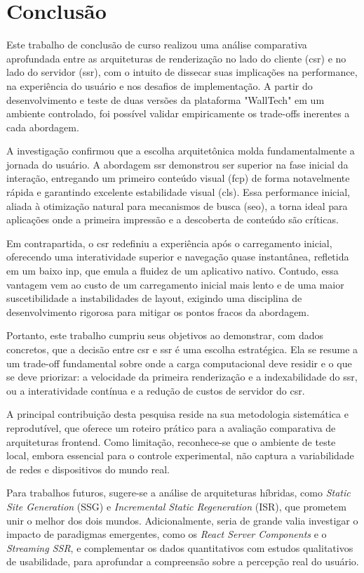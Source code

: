 \chapter{Conclusão}
\label{cap:conclusao}

Este trabalho de conclusão de curso realizou uma análise comparativa aprofundada entre as arquiteturas de renderização no lado do cliente (\acrshort{csr}) e no lado do servidor (\acrshort{ssr}), com o intuito de dissecar suas implicações na performance, na experiência do usuário e nos desafios de implementação. A partir do desenvolvimento e teste de duas versões da plataforma "WallTech" em um ambiente controlado, foi possível validar empiricamente os trade-offs inerentes a cada abordagem.

A investigação confirmou que a escolha arquitetônica molda fundamentalmente a jornada do usuário. A abordagem \acrshort{ssr} demonstrou ser superior na fase inicial da interação, entregando um primeiro conteúdo visual (\acrshort{fcp}) de forma notavelmente rápida e garantindo excelente estabilidade visual (\acrshort{cls}). Essa performance inicial, aliada à otimização natural para mecanismos de busca (\acrshort{seo}), a torna ideal para aplicações onde a primeira impressão e a descoberta de conteúdo são críticas.

Em contrapartida, o \acrshort{csr} redefiniu a experiência após o carregamento inicial, oferecendo uma interatividade superior e navegação quase instantânea, refletida em um baixo \acrshort{inp}, que emula a fluidez de um aplicativo nativo. Contudo, essa vantagem vem ao custo de um carregamento inicial mais lento e de uma maior suscetibilidade a instabilidades de layout, exigindo uma disciplina de desenvolvimento rigorosa para mitigar os pontos fracos da abordagem.

Portanto, este trabalho cumpriu seus objetivos ao demonstrar, com dados concretos, que a decisão entre \acrshort{csr} e \acrshort{ssr} é uma escolha estratégica. Ela se resume a um trade-off fundamental sobre onde a carga computacional deve residir e o que se deve priorizar: a velocidade da primeira renderização e a indexabilidade do \acrshort{ssr}, ou a interatividade contínua e a redução de custos de servidor do \acrshort{csr}.

A principal contribuição desta pesquisa reside na sua metodologia sistemática e reprodutível, que oferece um roteiro prático para a avaliação comparativa de arquiteturas frontend. Como limitação, reconhece-se que o ambiente de teste local, embora essencial para o controle experimental, não captura a variabilidade de redes e dispositivos do mundo real.

Para trabalhos futuros, sugere-se a análise de arquiteturas híbridas, como \textit{Static Site Generation} (SSG) e \textit{Incremental Static Regeneration} (ISR), que prometem unir o melhor dos dois mundos. Adicionalmente, seria de grande valia investigar o impacto de paradigmas emergentes, como os \textit{React Server Components} e o \textit{Streaming SSR}, e complementar os dados quantitativos com estudos qualitativos de usabilidade, para aprofundar a compreensão sobre a percepção real do usuário.